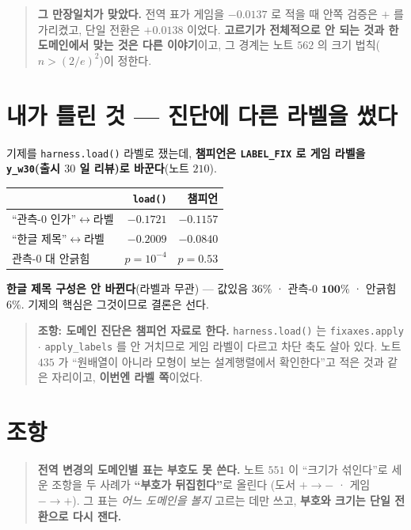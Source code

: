 \documentclass[11pt]{article}
\begin{document}
\begin{quote}
\textbf{그 만장일치가 맞았다.} 전역 표가 게임을 $-0.0137$ 로 적을 때 안쪽
검증은 $+$ 를 가리켰고, 단일 전환은 $+0.0138$ 이었다. \textbf{고르기가
전체적으로 안 되는 것과 한 도메인에서 맞는 것은 다른 이야기}이고, 그 경계는
노트 $562$ 의 크기 법칙($n > (2/e)^2$)이 정한다.
\end{quote}

\section*{내가 틀린 것 --- 진단에 다른 라벨을 썼다}

기제를 \texttt{harness.load()} 라벨로 쟀는데, \textbf{챔피언은
\texttt{LABEL\_FIX} 로 게임 라벨을 \texttt{y\_w30}(출시 $30$ 일 리뷰)로
바꾼다}(노트 $210$).

\begin{center}
\begin{tabular}{lrr}
\hline
 & \texttt{load()} & \textbf{챔피언} \\
\hline
``관측-$0$ 인가''$\leftrightarrow$라벨 & $-0.1721$ & $\mathbf{-0.1157}$ \\
``한글 제목''$\leftrightarrow$라벨 & $-0.2009$ & $\mathbf{-0.0840}$ \\
관측-$0$ 대 안긁힘 & $p=10^{-4}$ & $p=0.53$ \\
\hline
\end{tabular}
\end{center}

\textbf{한글 제목 구성은 안 바뀐다}(라벨과 무관) --- 값있음 $36\%$ ·
관측-$0$ $\mathbf{100\%}$ · 안긁힘 $6\%$. 기제의 핵심은 그것이므로 결론은
선다.

\begin{quote}
\textbf{조항: 도메인 진단은 챔피언 자료로 한다.} \texttt{harness.load()} 는
\texttt{fixaxes.apply} $\cdot$ \texttt{apply\_labels} 를 안 거치므로 게임
라벨이 다르고 차단 축도 살아 있다. 노트 $435$ 가 ``원배열이 아니라 모형이
보는 설계행렬에서 확인한다''고 적은 것과 같은 자리이고, \textbf{이번엔 라벨
쪽}이었다.
\end{quote}

\section*{조항}

\begin{quote}
\textbf{전역 변경의 도메인별 표는 부호도 못 쓴다.} 노트 $551$ 이 ``크기가
섞인다''로 세운 조항을 두 사례가 \textbf{``부호가 뒤집힌다''}로 올린다
(도서 $+ \to -$ · 게임 $- \to +$). 그 표는 \emph{어느 도메인을 볼지}
고르는 데만 쓰고, \textbf{부호와 크기는 단일 전환으로 다시 잰다.}
\end{quote}
\end{document}

